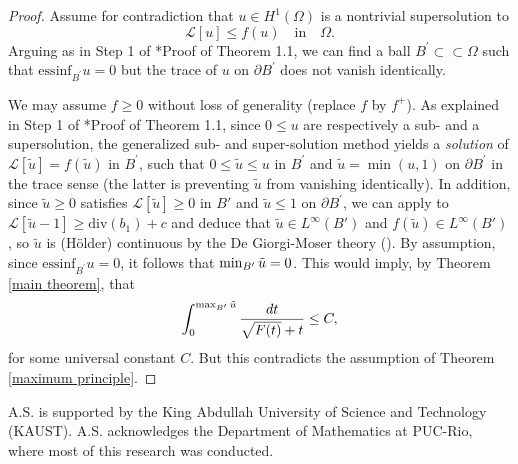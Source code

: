 \documentclass[12pt,a4paper]{amsart}
\numberwithin{equation}{section} %
\theoremstyle{definition}
\theoremstyle{remark}
\def \div {\mathrm{div}}
\begin{document}
\begin{proof}
Assume for contradiction that $u \in H^1(\Omega)$ is a nontrivial supersolution to
$$
    \mathcal{L}[u] \leq f(u) \quad \text{in} \quad \Omega.
$$
Arguing as in Step 1 of \cite{SS21}*{Proof of Theorem 1.1}, we can find  a ball
$B^\prime\subset\subset\Omega$ such that $\mathrm{essinf}_{B^\prime}u=0$ but the trace of $u$ on $\partial B^\prime$ does not vanish identically.

We may assume $f\ge 0$ without loss of generality (replace $f$ by $f^+$). As explained in Step 1 of \cite{SS21}*{Proof of Theorem 1.1}, since $0\le u$ are respectively a sub- and a supersolution, the generalized sub- and super-solution method yields a {\it solution} of $\mathcal{L}[\tilde u]=f(\tilde u)$ in $B^\prime$, such that $0\le \tilde u\le u$  in $B^\prime$ and $\tilde u = {\min(u,1)}$ on $\partial B^\prime$ in the trace sense (the latter is preventing $\tilde u$ from vanishing identically). In addition, since $\tilde u\ge 0$ satisfies $\mathcal{L}[\tilde u]\ge 0$ in $B'$ and $\tilde u \le 1$ on $\partial B^\prime$, we can apply  \cite[Theorem 8.15]{GT} to $\mathcal{L}[\tilde u-1]\ge \div(b_1)+c$ and deduce that 
 $\tilde u\in L^\infty(B')$ and $f(\tilde u)\in L^\infty(B')$, so $\tilde u$ is (H\"older) continuous by the De Giorgi-Moser theory (\cite[Theorem 8.15]{GT}). By assumption, since $\mathrm{essinf}_{B^\prime}u=0$, it follows that $\min_{B'} \Tilde{u} = 0$. This would imply, by Theorem \ref{main theorem}, that
$$
    \int_{0}^{\max_{B'}\Tilde{u}}\frac{dt}{\sqrt{F(t)}+t} \leq C,
$$
for some universal constant $C$. But this contradicts the assumption of Theorem \ref{maximum principle}.
\end{proof}

\bigskip

{\small {} A.S. is supported by the King Abdullah University of Science and Technology (KAUST). A.S. acknowledges the Department of Mathematics at PUC-Rio, where most of this research was conducted.}

\bigskip

\end{document}

